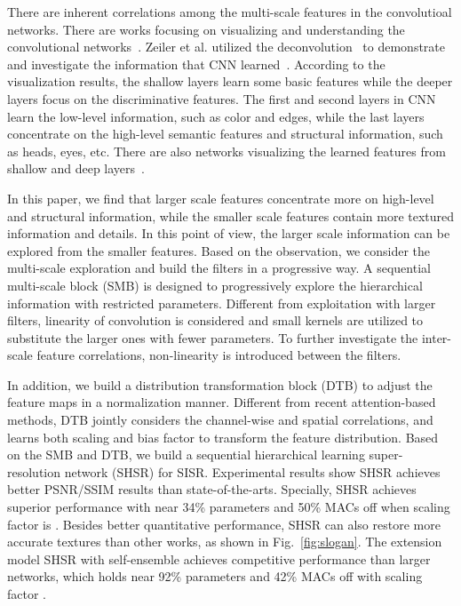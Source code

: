 \documentclass[manuscript,screen]{acmart}
\begin{document}
There are inherent correlations among the multi-scale features in the convolutioal networks. There are works focusing on visualizing and understanding the convolutional networks~\cite{review2_1, reviewer2_2}. Zeiler et al. utilized the deconvolution~\cite{review2_1} to demonstrate and investigate the information that CNN learned~\cite{reviewer2_2}. According to the visualization results, the shallow layers learn some basic features while the deeper layers focus on the discriminative features. The first and second layers in CNN learn the low-level information, such as color and edges, while the last layers concentrate on the high-level semantic features and structural information, such as heads, eyes, etc. There are also networks visualizing the learned features from shallow and deep layers~\cite{reviewer2_3, review2_4}.

In this paper, we find that larger scale features concentrate more on high-level and structural information, while the smaller scale features contain more textured information and details. In this point of view, the larger scale information can be explored from the smaller features. Based on the observation, we consider the multi-scale exploration and build the filters in a progressive way. A sequential multi-scale block (SMB) is designed to progressively explore the hierarchical information with restricted parameters. Different from exploitation with larger filters, linearity of convolution is considered and small kernels are utilized to substitute the larger ones with fewer parameters. To further investigate the inter-scale feature correlations, non-linearity is introduced between the filters. 

In addition, we build a distribution transformation block (DTB) to adjust the feature maps in a normalization manner. Different from recent attention-based methods, DTB jointly considers the channel-wise and spatial correlations, and learns both scaling and bias factor to transform the feature distribution. 
Based on the SMB and DTB, we build a sequential hierarchical learning super-resolution network (SHSR) for SISR. Experimental results show SHSR achieves better PSNR/SSIM results than state-of-the-arts. Specially, SHSR achieves superior performance with near 34\% parameters and 50\% MACs off when scaling factor is . Besides better quantitative performance, SHSR can also restore more accurate textures than other works, as shown in Fig.~\ref{fig:slogan}. The extension model SHSR with self-ensemble achieves competitive performance than larger networks, which holds near 92\% parameters and 42\% MACs off with scaling factor .
\end{document}
